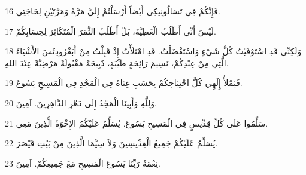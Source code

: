 \par 16 فَإِنَّكُمْ فِي تَسَالُونِيكِي أَيْضاً أَرْسَلْتُمْ إِلَيَّ مَرَّةً وَمَرَّتَيْنِ لِحَاجَتِي.
\par 17 لَيْسَ أَنِّي أَطْلُبُ الْعَطِيَّةَ، بَلْ أَطْلُبُ الثَّمَرَ الْمُتَكَاثِرَ لِحِسَابِكُمْ.
\par 18 وَلَكِنِّي قَدِ اسْتَوْفَيْتُ كُلَّ شَيْءٍ وَاسْتَفْضَلْتُ. قَدِ امْتَلَأْتُ إِذْ قَبِلْتُ مِنْ أَبَفْرُودِتُسَ الأَشْيَاءَ الَّتِي مِنْ عِنْدِكُمْ، نَسِيمَ رَائِحَةٍ طَيِّبَةٍ، ذَبِيحَةً مَقْبُولَةً مَرْضِيَّةً عِنْدَ اللهِ.
\par 19 فَيَمْلأُ إِلَهِي كُلَّ احْتِيَاجِكُمْ بِحَسَبِ غِنَاهُ فِي الْمَجْدِ فِي الْمَسِيحِ يَسُوعَ.
\par 20 وَلِلَّهِ وَأَبِينَا الْمَجْدُ إِلَى دَهْرِ الدَّاهِرِينَ. آمِينَ.
\par 21 سَلِّمُوا عَلَى كُلِّ قِدِّيسٍ فِي الْمَسِيحِ يَسُوعَ. يُسَلِّمُ عَلَيْكُمُ الإِخْوَةُ الَّذِينَ مَعِي.
\par 22 يُسَلِّمُ عَلَيْكُمْ جَمِيعُ الْقِدِّيسِينَ وَلاَ سِيَّمَا الَّذِينَ مِنْ بَيْتِ قَيْصَرَ.
\par 23 نِعْمَةُ رَبِّنَا يَسُوعَ الْمَسِيحِ مَعَ جَمِيعِكُمْ. آمِينَ.

